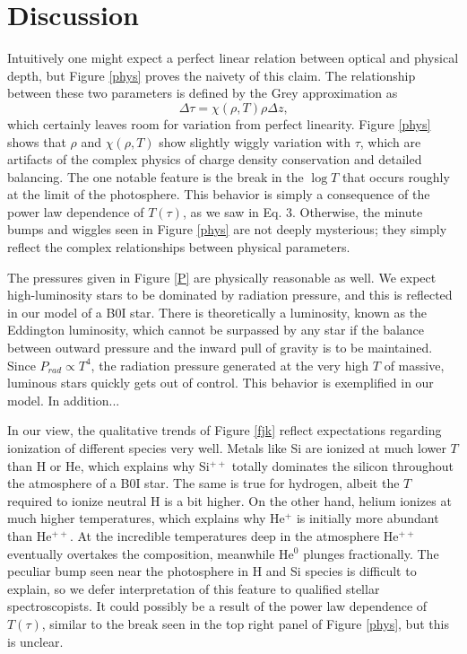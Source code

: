 \documentclass[iop,revtex4]{emulateapj}
\begin{document}
\section{Discussion} \label{discussion}
Intuitively one might expect a perfect linear relation between optical and physical depth, but Figure \ref{phys} proves the naivety of this claim. The relationship between these two parameters is defined by the Grey approximation as
\begin{equation}
\Delta\tau=\chi(\rho,T)\rho\Delta z\text{,}
\end{equation}
which certainly leaves room for variation from perfect linearity. Figure \ref{phys} shows that $\rho$ and $\chi(\rho,T)$ show slightly wiggly variation with $\tau$, which are artifacts of the complex physics of charge density conservation and detailed balancing. The one notable feature is the break in the $\log T$ that occurs roughly at the limit of the photosphere. This behavior is simply a consequence of the power law dependence of $T(\tau)$, as we saw in Eq. 3. Otherwise, the minute bumps and wiggles seen in Figure \ref{phys} are not deeply mysterious; they simply reflect the complex relationships between physical parameters.
\par
The pressures given in Figure \ref{P} are physically reasonable as well. We expect high-luminosity stars to be dominated by radiation pressure, and this is reflected in our model of a B0I star. There is theoretically a luminosity, known as the Eddington luminosity, which cannot be surpassed by any star if the balance between outward pressure and the inward pull of gravity is to be maintained. Since $P_{rad}\propto T^{4}$, the radiation pressure generated at the very high $T$ of massive, luminous stars quickly gets out of control. This behavior is exemplified in our model. In addition...
\par
In our view, the qualitative trends of Figure \ref{fjk} reflect expectations regarding ionization of different species very well. Metals like Si are ionized at much lower $T$ than H or He, which explains why Si$^{++}$ totally dominates the silicon throughout the atmosphere of a B0I star. The same is true for hydrogen, albeit the $T$ required to ionize neutral H is a bit higher. On the other hand, helium ionizes at much higher temperatures, which explains why He$^{+}$ is initially more abundant than He$^{++}$. At the incredible temperatures deep in the atmosphere He$^{++}$ eventually overtakes the composition, meanwhile He$^{0}$ plunges fractionally. The peculiar bump seen near the photosphere in H and Si species is difficult to explain, so we defer interpretation of this feature to qualified stellar spectroscopists. It could possibly be a result of the power law dependence of $T(\tau)$, similar to the break seen in the top right panel of Figure \ref{phys}, but this is unclear.
\end{document}
